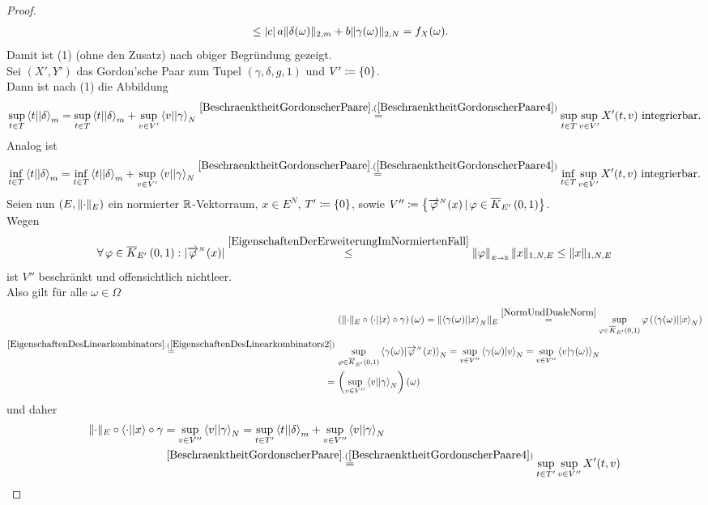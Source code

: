 \begin{proof}
\begin{align*}
&\le\left|c\right|a\lVert\delta(\omega)\rVert_{2,m}+b\lVert\gamma(\omega)\rVert_{2,N}=f_X(\omega)
\text.\end{align*}
Damit ist (1) (ohne den Zusatz) nach obiger Begründung gezeigt.\\
Sei $(X', Y')$ das Gordon'sche Paar zum Tupel $(\gamma, \delta, g, 1)$ und
$V' \coloneqq  \left\{0\right\}$.\\
Dann ist nach (1) die Abbildung
\[\sup_{t \in T}\bprod t \delta_m =
\sup_{t \in T}\bprod t \delta_m + \sup_{v \in V'} \bprod v \gamma_N
\overset{\refclaim{BeschraenktheitGordonscherPaare}
{BeschraenktheitGordonscherPaare4}}=
\sup_{t \in T}\sup_{v\in V'}X'(t, v) \text{ integrierbar.}\]
Analog ist
\[\inf_{t \in T}\bprod t \delta _m =\inf_{t \in T}\bprod t \delta_m + \sup_{v \in V'} \bprod v \gamma_N
\overset{\refclaim{BeschraenktheitGordonscherPaare}
{BeschraenktheitGordonscherPaare4}}=
\inf_{t \in T}\sup_{v\in V'}X'(t, v) \text{ integrierbar.}\]
Seien nun $(E, \lVert\cdot\rVert_E)$ ein normierter $\mathbb{R}$-Vektorraum, $x \in E^N$,
$T'\coloneqq  \left\{0\right\}$, sowie $V''\coloneqq  \left\{{\overrightarrow{\varphi}}^{{}_N} (x)\,|\,\varphi \in \overline K_{E'}\left(0, 1\right)\right\}$.\\
Wegen
\[\forall\, \varphi \in \overline K_{E'}\left(0, 1\right): \left|{\overrightarrow{\varphi}}^{{}_N} (x)\right|
\overset{\ref{EigenschaftenDerErweiterungImNormiertenFall}}\le
\left\|\varphi\right\|_{\scriptscriptstyle{E \rightarrow \ensuremath{\mathbb{R}}}} \lVert x\rVert _{1, N, E} \le \lVert x\rVert _{1, N, E}\]
ist $V''$ beschränkt und offensichtlich nichtleer.\\
Also gilt für alle $\omega \in \Omega$
\begin{align*}
&\,\left(\norm\cdot_E \circ \bprod \cdot x \circ \gamma \right)(\omega)
=\norm{\bprod {\gamma(\omega)} x_N}_E
 \overset{\ref{NormUndDualeNorm}}=
\sup_{\varphi \in \kabg{E'}01}\varphi\left(\bprod{\gamma(\omega)}x_N \right)\\
\overset{\refclaim{EigenschaftenDesLinearkombinators}
{EigenschaftenDesLinearkombinators2}}= &\,
\sup_{\varphi \in \kabg{E'}01}\sprod{\gamma(\omega)}{\pfeil \varphi N (x)}_N
= \sup_{v \in V''}\sprod{\gamma(\omega)}v_N
=  \sup_{v \in V''}\sprod v{\gamma(\omega)}_N\\
=&\, \left(\sup_{v \in V''}\bprod v \gamma_N\right)(\omega)
\end{align*}
und daher
\begin{align*}
\norm\cdot_E \circ \bprod \cdot x \circ \gamma &=
\sup_{v \in V''}\bprod v \gamma_N 
= \sup_{t \in T'}\bprod t \delta_m + \sup_{v \in V''}\bprod v \gamma_N\\
&\overset{\refclaim{BeschraenktheitGordonscherPaare}
{BeschraenktheitGordonscherPaare4}}= \sup_{t \in T'}\sup_{v \in V''}X'(t,v)

\end{align*}
\end{proof}
